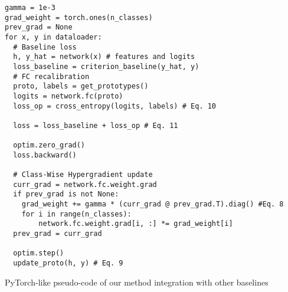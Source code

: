 \begin{algorithm}[ht]
    \tiny
    \begin{verbatim}
gamma = 1e-3
grad_weight = torch.ones(n_classes)
prev_grad = None
for x, y in dataloader:
  # Baseline loss
  h, y_hat = network(x) # features and logits
  loss_baseline = criterion_baseline(y_hat, y)
  # FC recalibration
  proto, labels = get_prototypes()
  logits = network.fc(proto)
  loss_op = cross_entropy(logits, labels) # Eq. 10
  
  loss = loss_baseline + loss_op # Eq. 11
  
  optim.zero_grad()
  loss.backward()
  
  # Class-Wise Hypergradient update
  curr_grad = network.fc.weight.grad
  if prev_grad is not None:
    grad_weight += gamma * (curr_grad @ prev_grad.T).diag() #Eq. 8
    for i in range(n_classes):
        network.fc.weight.grad[i, :] *= grad_weight[i]
  prev_grad = curr_grad
  
  optim.step()
  update_proto(h, y) # Eq. 9
    \end{verbatim}
    \vspace{-0.3cm}
    \caption{PyTorch-like pseudo-code of our method integration with other baselines}
    \label{code:pseudo_code}
\end{algorithm}